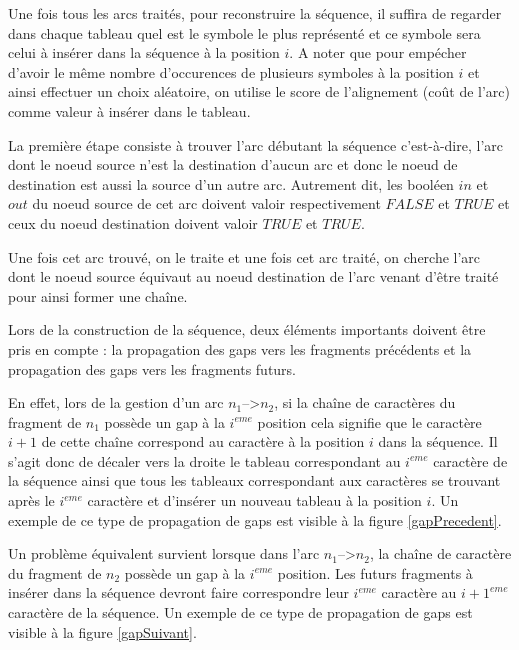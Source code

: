 \documentclass[12pt,a4paper,final]{article}
\begin{document}
Une fois tous les arcs traités, pour reconstruire la séquence, il suffira de regarder dans chaque tableau quel est le symbole le plus représenté et ce symbole sera celui à insérer dans la séquence à la position $i$.  A noter que pour empécher d'avoir le même nombre d'occurences de plusieurs symboles à la position $i$ et ainsi effectuer un choix aléatoire, on utilise le score de l'alignement (coût de l'arc) comme valeur à insérer dans le tableau.\medskip

La première étape consiste à trouver l'arc débutant la séquence c'est-à-dire, l'arc dont le noeud source n'est la destination d'aucun arc et donc le noeud de destination est aussi la source d'un autre arc.%
Autrement dit, les booléen $in$ et $out$ du noeud source de cet arc doivent valoir respectivement $FALSE$ et $TRUE$  et ceux du noeud destination doivent valoir $TRUE$ et $TRUE$.\medskip

Une fois cet arc trouvé, on le traite et une fois cet arc traité, on cherche l'arc dont le noeud source équivaut au noeud destination de l'arc venant d'être traité pour ainsi former une chaîne.\medskip

Lors de la construction de la séquence, deux éléments importants doivent être pris en compte : la propagation des gaps vers les fragments précédents et la propagation des gaps vers les fragments futurs.\medskip

En effet, lors de la gestion d'un arc $n_1$-->$n_2$, si la chaîne de caractères du fragment de $n_1$ possède un gap à la $i^{eme}$ position cela signifie que le caractère $i+1$ de cette chaîne correspond au caractère à la position $i$ dans la séquence.  Il s'agit donc de décaler vers la droite le tableau correspondant au $i^{eme}$ caractère de la séquence ainsi que tous les tableaux correspondant aux caractères se trouvant après le $i^{eme}$ caractère et d'insérer un nouveau tableau à la position $i$.  Un exemple de ce type de propagation de gaps est visible à la figure \ref{gapPrecedent}.\medskip

Un problème équivalent survient lorsque dans l'arc $n_1$-->$n_2$, la chaîne de caractère du fragment de $n_2$ possède un gap à la $i^{eme}$ position.  Les futurs fragments à insérer dans la séquence devront faire correspondre leur $i^{eme}$ caractère au $i+1^{eme}$ caractère de la séquence.  Un exemple de ce type de propagation de gaps est visible à la figure \ref{gapSuivant}.\medskip
\end{document}
